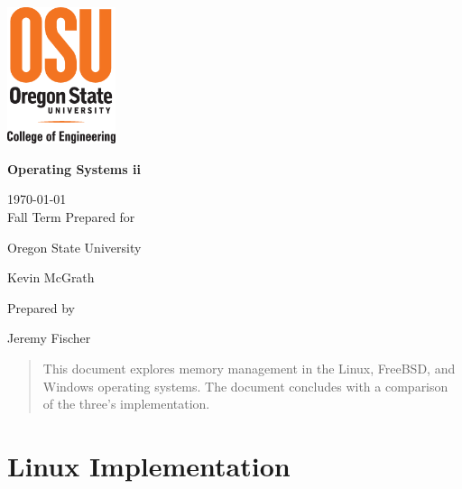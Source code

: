 \documentclass[onecolumn,draftclsnofoot, 10pt, compsoc]{IEEEtran}
\def \GroupNumber{		17}
\def \Jeremy{			Jeremy Fischer}
\def \Class{		Operating Systems ii}
\def \School{	Oregon State University}
\def \Professor{		 Kevin McGrath}
\begin{document}
\begin{titlepage}
    \begin{singlespace}
    \includegraphics[height=4cm]{coe.eps}
        \hfill  
        \par\vspace{.2in}
        \centering
        \scshape{
            \vspace{.5in}
            \textbf{\Huge\Class}\par
            \large{
            	\today \\Fall Term
        	}
            \vfill
            {\large Prepared for}\par
            \huge \School\par
            \vspace{5pt}
            {\Large{\Professor}\par}
            {\large Prepared by }\par
            \vspace{5pt}
            {\Large
                {\Jeremy}\par
            }
            \vspace{20pt}
        }
        \begin{abstract}
        	This document explores memory management in the Linux, FreeBSD, and Windows operating systems. 
        	The document concludes with a comparison of the three's implementation.
        \end{abstract}     
    \end{singlespace}
\end{titlepage}
\newpage
{}
\tableofcontents
\clearpage









\section{Linux Implementation}
\end{document}
